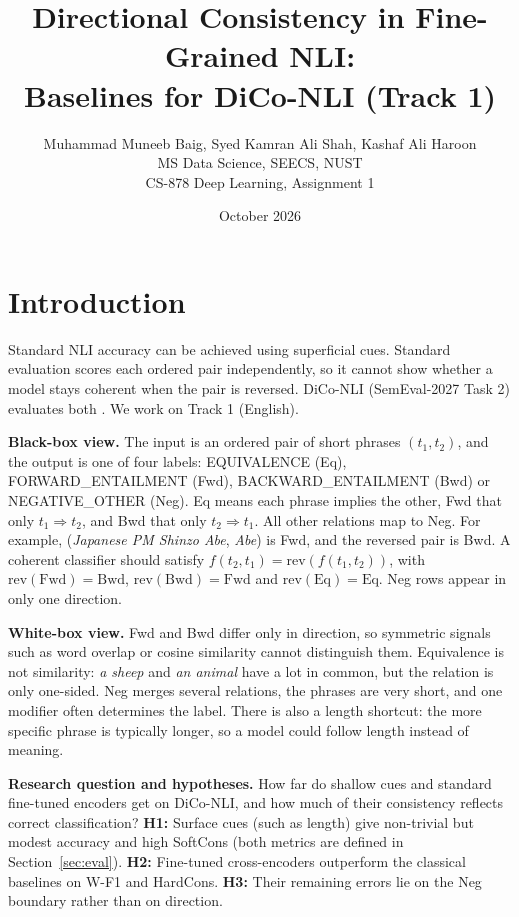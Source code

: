 \documentclass[10pt,a4paper,twocolumn]{article}
\title{Directional Consistency in Fine-Grained NLI:\\ Baselines for DiCo-NLI (Track 1)}
\author{Muhammad Muneeb Baig, Syed Kamran Ali Shah, Kashaf Ali Haroon\\ MS Data Science, SEECS, NUST\\ CS-878 Deep Learning, Assignment 1}
\date{October 2026}
\begin{document}
\maketitle

\section{Introduction}

Standard NLI accuracy can be achieved using superficial cues. Standard evaluation scores each ordered pair independently, so it cannot show whether a model stays coherent when the pair is reversed. DiCo-NLI (SemEval-2027 Task 2) evaluates both \citep{diconli2026}. We work on Track 1 (English).

\textbf{Black-box view.} The input is an ordered pair of short phrases $(t_1, t_2)$, and the output is one of four labels: EQUIVALENCE (Eq), FORWARD\_\allowbreak{}ENTAILMENT (Fwd), BACKWARD\_\allowbreak{}ENTAILMENT (Bwd) or NEGATIVE\_\allowbreak{}OTHER (Neg). Eq means each phrase implies the other, Fwd that only $t_1 \Rightarrow t_2$, and Bwd that only $t_2 \Rightarrow t_1$. All other relations map to Neg. For example, (\emph{Japanese PM Shinzo Abe}, \emph{Abe}) is Fwd, and the reversed pair is Bwd. A coherent classifier should satisfy $f(t_2, t_1) = \mathrm{rev}(f(t_1, t_2))$, with $\mathrm{rev}(\text{Fwd}) = \text{Bwd}$, $\mathrm{rev}(\text{Bwd}) = \text{Fwd}$ and $\mathrm{rev}(\text{Eq}) = \text{Eq}$. Neg rows appear in only one direction.

\textbf{White-box view.} Fwd and Bwd differ only in direction, so symmetric signals such as word overlap or cosine similarity cannot distinguish them. Equivalence is not similarity: \emph{a sheep} and \emph{an animal} have a lot in common, but the relation is only one-sided. Neg merges several relations, the phrases are very short, and one modifier often determines the label. There is also a length shortcut: the more specific phrase is typically longer, so a model could follow length instead of meaning.

\textbf{Research question and hypotheses.} How far do shallow cues and standard fine-tuned encoders get on DiCo-NLI, and how much of their consistency reflects correct classification? \textbf{H1:} Surface cues (such as length) give non-trivial but modest accuracy and high SoftCons (both metrics are defined in Section~\ref{sec:eval}). \textbf{H2:} Fine-tuned cross-encoders outperform the classical baselines on W-F1 and HardCons. \textbf{H3:} Their remaining errors lie on the Neg boundary rather than on direction.
\end{document}
